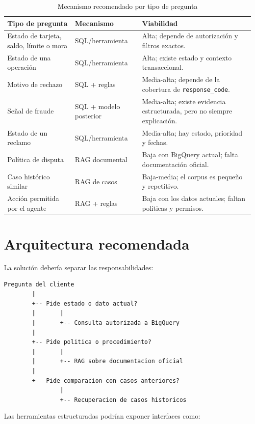 \documentclass[11pt,a4paper]{article}
\begin{document}
\begin{table}[ht]
\centering
\small
\caption{Mecanismo recomendado por tipo de pregunta}
\begin{tabularx}{\textwidth}{>{\raggedright\arraybackslash}p{} >{\raggedright\arraybackslash}p{} X}
\toprule
Tipo de pregunta & Mecanismo & Viabilidad \\
\midrule
Estado de tarjeta, saldo, límite o mora & SQL/herramienta & Alta; depende de autorización y filtros exactos. \\
Estado de una operación & SQL/herramienta & Alta; existe estado y contexto transaccional. \\
Motivo de rechazo & SQL + reglas & Media-alta; depende de la cobertura de \texttt{response\_code}. \\
Señal de fraude & SQL + modelo posterior & Media-alta; existe evidencia estructurada, pero no siempre explicación. \\
Estado de un reclamo & SQL/herramienta & Media-alta; hay estado, prioridad y fechas. \\
Política de disputa & RAG documental & Baja con BigQuery actual; falta documentación oficial. \\
Caso histórico similar & RAG de casos & Baja-media; el corpus es pequeño y repetitivo. \\
Acción permitida por el agente & RAG + reglas & Baja con los datos actuales; faltan políticas y permisos. \\
\bottomrule
\end{tabularx}
\end{table}

\section{Arquitectura recomendada}

La solución debería separar las responsabilidades:

\begin{lstlisting}
Pregunta del cliente
        |
        +-- Pide estado o dato actual?
        |       |
        |       +-- Consulta autorizada a BigQuery
        |
        +-- Pide politica o procedimiento?
        |       |
        |       +-- RAG sobre documentacion oficial
        |
        +-- Pide comparacion con casos anteriores?
                |
                +-- Recuperacion de casos historicos
\end{lstlisting}

Las herramientas estructuradas podrían exponer interfaces como:
\end{document}
